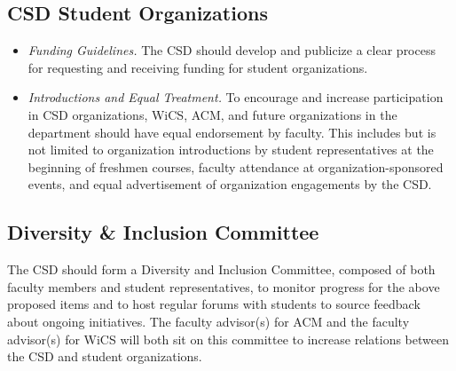 \documentclass{article}
\begin{document}
\subsection{CSD Student Organizations}
\begin{itemize}
\item
\emph{Funding Guidelines.}
The CSD should develop and publicize a clear process for requesting and receiving funding for student organizations.
\item
\emph{Introductions and Equal Treatment.}
To encourage and increase participation in CSD organizations, WiCS, ACM, and future organizations in 
the department should have equal endorsement by faculty. This includes but is not limited to organization introductions by student
representatives at the beginning of freshmen courses, faculty attendance at organization-sponsored events, and equal 
advertisement of organization engagements by the CSD. 
\end{itemize}

\subsection{Diversity \& Inclusion Committee} 
The CSD should form a Diversity and Inclusion Committee, composed of both faculty members and 
student representatives, to monitor progress for the above proposed items and to host regular forums with 
students to source feedback about ongoing initiatives. The faculty advisor(s) for ACM and the faculty advisor(s)
for WiCS will both sit on this committee to increase relations between the CSD and student organizations. 

\end{document}
